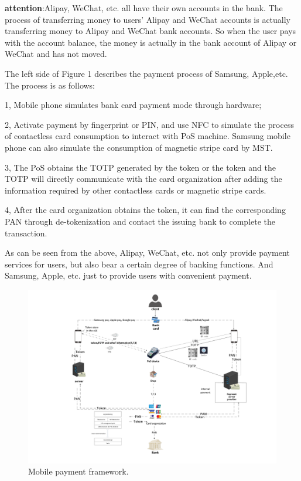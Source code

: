 \documentclass[journal]{IEEEtran}
\begin{document}
\textbf{attention}:Alipay, WeChat, etc. all have their own accounts in the bank. The process of transferring money to users' Alipay and WeChat accounts is actually transferring money to Alipay and WeChat bank accounts. So when the user pays with the account balance, the money is actually in the bank account of Alipay or WeChat and has not moved.

The left side of Figure 1 describes the payment process of Samsung, Apple,etc. The process is as follows:

1, Mobile phone simulates bank card payment mode through hardware;

2, Activate payment by fingerprint or PIN, and use NFC to simulate the process of contactless card consumption to interact with PoS machine. Samsung mobile phone can also simulate the consumption of magnetic stripe card by MST. 

3, The PoS obtains the TOTP generated by the token or the token and the TOTP will directly communicate with the card organization after adding the information required by other contactless cards or magnetic stripe cards.

4, After the card organization obtains the token, it can find the corresponding PAN through de-tokenization and contact the issuing bank to complete the transaction.

As can be seen from the above, Alipay, WeChat, etc. not only provide payment services for users, but also bear a certain degree of banking functions. And Samsung, Apple, etc. just to provide users with convenient payment.


\begin{figure}[htbp]
\centerline{\includegraphics[scale=0.48]{datu.pdf}}
\caption{Mobile payment framework.}
\label{fig}
\end{figure}
\end{document}
